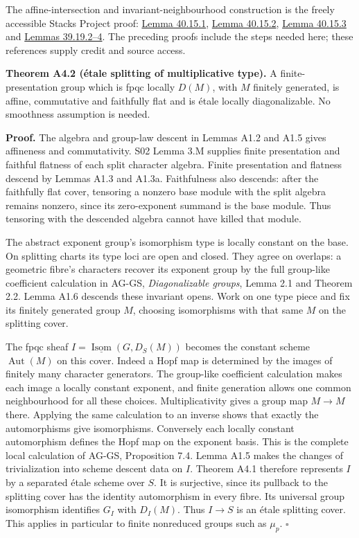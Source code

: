 \documentclass[11pt,a4paper,openany]{report}
\begin{document}
The affine-intersection and invariant-neighbourhood construction is the freely accessible Stacks Project proof: \href{https://stacks.math.columbia.edu/tag/0API}{Lemma 40.15.1}, \href{https://stacks.math.columbia.edu/tag/0APJ}{Lemma 40.15.2}, \href{https://stacks.math.columbia.edu/tag/0APK}{Lemma 40.15.3} and \href{https://stacks.math.columbia.edu/tag/03LN}{Lemmas 39.19.2--4}. The preceding proofs include the steps needed here; these references supply credit and source access.

\textbf{Theorem A4.2 (étale splitting of multiplicative type).} A finite-presentation group which is fpqc locally \(D(M)\), with \(M\) finitely generated, is affine, commutative and faithfully flat and is étale locally diagonalizable. No smoothness assumption is needed.

\textbf{Proof.} The algebra and group-law descent in Lemmas A1.2 and A1.5 gives affineness and commutativity. S02 Lemma 3.M supplies finite presentation and faithful flatness of each split character algebra. Finite presentation and flatness descend by Lemmas A1.3 and A1.3a. Faithfulness also descends: after the faithfully flat cover, tensoring a nonzero base module with the split algebra remains nonzero, since its zero-exponent summand is the base module. Thus tensoring with the descended algebra cannot have killed that module.

The abstract exponent group's isomorphism type is locally constant on the base. On splitting charts its type loci are open and closed. They agree on overlaps: a geometric fibre's characters recover its exponent group by the full group-like coefficient calculation in AG-GS, \emph{Diagonalizable groups}, Lemma 2.1 and Theorem 2.2. Lemma A1.6 descends these invariant opens. Work on one type piece and fix its finitely generated group \(M\), choosing isomorphisms with that same \(M\) on the splitting cover.

The fpqc sheaf \(I=\underline{\operatorname{Isom}}(G,D_S(M))\) becomes the constant scheme \(\operatorname{Aut}(M)\) on this cover. Indeed a Hopf map is determined by the images of finitely many character generators. The group-like coefficient calculation makes each image a locally constant exponent, and finite generation allows one common neighbourhood for all these choices. Multiplicativity gives a group map \(M\to M\) there. Applying the same calculation to an inverse shows that exactly the automorphisms give isomorphisms. Conversely each locally constant automorphism defines the Hopf map on the exponent basis. This is the complete local calculation of AG-GS, Proposition 7.4. Lemma A1.5 makes the changes of trivialization into scheme descent data on \(I\). Theorem A4.1 therefore represents \(I\) by a separated étale scheme over \(S\). It is surjective, since its pullback to the splitting cover has the identity automorphism in every fibre. Its universal group isomorphism identifies \(G_I\) with \(D_I(M)\). Thus \(I\to S\) is an étale splitting cover. This applies in particular to finite nonreduced groups such as \(\mu_p\). \(\square\)
\end{document}
